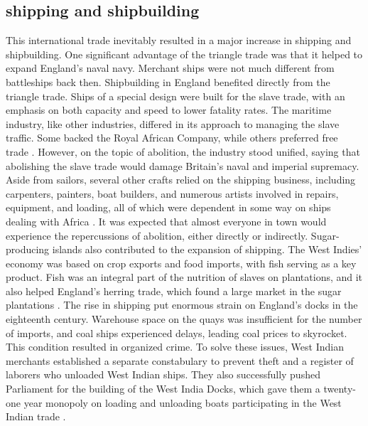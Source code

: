 \subsection{shipping and shipbuilding}
This international trade inevitably resulted in a major increase in shipping and shipbuilding. One significant advantage of the triangle trade was that it helped to expand England's naval navy. Merchant ships were not much different from battleships back then. Shipbuilding in England benefited directly from the triangle trade. Ships of a special design were built for the slave trade, with an emphasis on both capacity and speed to lower fatality rates. The maritime industry, like other industries, differed in its approach to managing the slave traffic. Some backed the Royal African Company, while others preferred free trade . However, on the topic of abolition, the industry stood unified, saying that abolishing the slave trade would damage Britain's naval and imperial supremacy. Aside from sailors, several other crafts relied on the shipping business, including carpenters, painters, boat builders, and numerous artists involved in repairs, equipment, and loading, all of which were dependent in some way on ships dealing with Africa . It was expected that almost everyone in town would experience the repercussions of abolition, either directly or indirectly. Sugar-producing islands also contributed to the expansion of shipping. The West Indies' economy was based on crop exports and food imports, with fish serving as a key product. Fish was an integral part of the nutrition of slaves on plantations, and it also helped England's herring trade, which found a large market in the sugar plantations . The rise in shipping put enormous strain on England's docks in the eighteenth century. Warehouse space on the quays was insufficient for the number of imports, and coal ships experienced delays, leading coal prices to skyrocket. This condition resulted in organized crime. To solve these issues, West Indian merchants established a separate constabulary to prevent theft and a register of laborers who unloaded West Indian ships. They also successfully pushed Parliament for the building of the West India Docks, which gave them a twenty-one year monopoly on loading and unloading boats participating in the West Indian trade .
